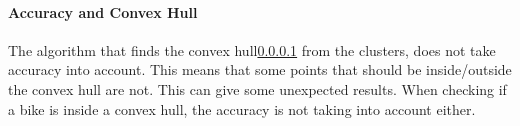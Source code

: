 \paragraph{Accuracy and Convex Hull}
The algorithm that finds the convex hull\cref{} from the clusters, does not take accuracy into account.
This means that some points that should be inside/outside the convex hull are not.
This can give some unexpected results.
When checking if a bike is inside a convex hull, the accuracy is not taking into account either.
